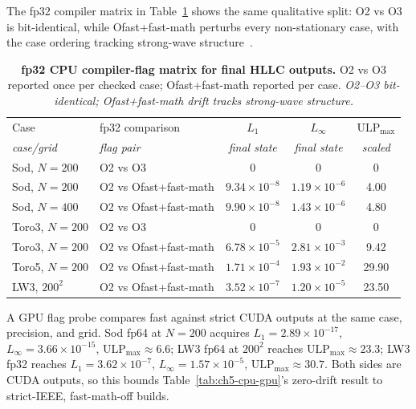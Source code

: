 The fp32 compiler matrix in Table~\ref{tab:ch5-fp32-flags} shows the same qualitative split: O2 vs O3 is bit-identical, while Ofast+fast-math perturbs every non-stationary case, with the case ordering tracking strong-wave structure~\citep{ieee754_2019,goldberg_1991}.

\begin{table}[htbp]
\centering
\small
\begin{tabular}{@{}llccc@{}}
\toprule
Case & fp32 comparison & {$L_1$} & {$L_\infty$} & {$\mathrm{ULP}_{\max}$} \\
\itshape case/grid & \itshape flag pair & {\itshape final state} & {\itshape final state} & {\itshape scaled} \\
\midrule \addlinespace[2pt]
Sod, $N=200$   & O2 vs O3             & 0       & 0       & 0     \\
Sod, $N=200$   & O2 vs Ofast+fast-math & $9.34\times10^{-8}$ & $1.19\times10^{-6}$ & 4.00  \\
Sod, $N=400$   & O2 vs Ofast+fast-math & $9.90\times10^{-8}$ & $1.43\times10^{-6}$ & 4.80  \\
Toro3, $N=200$ & O2 vs O3             & 0       & 0       & 0     \\
Toro3, $N=200$ & O2 vs Ofast+fast-math & $6.78\times10^{-5}$ & $2.81\times10^{-3}$ & 9.42  \\
Toro5, $N=200$ & O2 vs Ofast+fast-math & $1.71\times10^{-4}$ & $1.93\times10^{-2}$ & 29.90 \\
LW3, $200^2$   & O2 vs Ofast+fast-math & $3.52\times10^{-7}$ & $1.20\times10^{-5}$ & 23.50 \\
\bottomrule
\end{tabular}
\caption[fp32 CPU compiler-flag matrix for final HLLC outputs]{\textbf{fp32 CPU compiler-flag matrix for final HLLC outputs.}
  O2 vs O3 reported once per checked case; Ofast+fast-math reported per case.
  \emph{O2--O3 bit-identical; Ofast+fast-math drift tracks strong-wave structure.}}
\label{tab:ch5-fp32-flags}
\end{table}

A GPU flag probe compares fast against strict CUDA outputs at the same case,
precision, and grid. Sod fp64 at $N=200$ acquires
$L_1=2.89\times10^{-17}$, $L_\infty=3.66\times10^{-15}$,
$\mathrm{ULP}_{\max}\approx6.6$; LW3 fp64 at $200^2$ reaches
$\mathrm{ULP}_{\max}\approx23.3$; LW3 fp32 reaches
$L_1=3.62\times10^{-7}$, $L_\infty=1.57\times10^{-5}$,
$\mathrm{ULP}_{\max}\approx30.7$. Both sides are CUDA outputs, so this bounds
Table~\ref{tab:ch5-cpu-gpu}'s zero-drift result to strict-IEEE, fast-math-off
builds.

